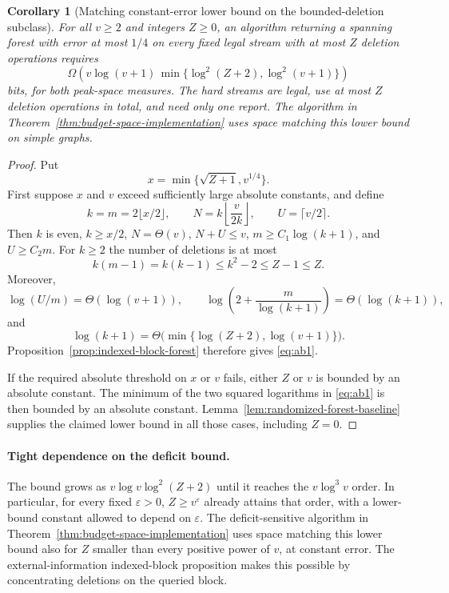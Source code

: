 \documentclass[11pt,letterpaper]{article}
\newtheorem{corollary}[theorem]{Corollary}
\numberwithin{equation}{section}
\begin{document}
\begin{corollary}[Matching constant-error lower bound on the bounded-deletion subclass]
\label{cor:all-budget-block-lower}
For all $v\ge2$ and integers $Z\ge0$, an algorithm returning a spanning forest with error at most $1/4$ on every fixed legal stream with at most $Z$ deletion operations requires
\begin{equation}
\Omega\!\left(
 v\log(v+1)\,
 \min\{\log^2(Z+2),\log^2(v+1)\}\right)
 \label{eq:ab1}
\end{equation}
bits, for both peak-space measures.
The hard streams are legal, use at most $Z$ deletion operations in total, and need only one report.
The algorithm in Theorem~\ref{thm:budget-space-implementation} uses space matching this lower bound on simple graphs.
\end{corollary}
\begin{proof}
Put
\[
 x=\min\{\sqrt{Z+1},v^{1/4}\}.
\]
First suppose $x$ and $v$ exceed sufficiently large absolute constants, and define
\[
 k=m=2\lfloor x/2\rfloor,\qquad
 N=k\left\lfloor\frac v{2k}\right\rfloor,\qquad
 U=\lceil v/2\rceil.
\]
Then $k$ is even, $k\ge x/2$, $N=\Theta(v)$, $N+U\le v$, $m\ge C_1\log(k+1)$, and $U\ge C_2m$.
For $k\ge2$ the number of deletions is at most
\[
 k(m-1)=k(k-1)\le k^2-2\le Z-1\le Z.
\]
Moreover,
\[
 \log(U/m)=\Theta(\log(v+1)),\qquad
 \log\left(2+\frac m{\log(k+1)}\right)=\Theta(\log(k+1)),
\]
and
\[
 \log(k+1)=\Theta\bigl(
   \min\{\log(Z+2),\log(v+1)\}\bigr).
\]
Proposition~\ref{prop:indexed-block-forest} therefore gives \eqref{eq:ab1}.

If the required absolute threshold on $x$ or $v$ fails, either $Z$ or $v$ is bounded by an absolute constant.
The minimum of the two squared logarithms in \eqref{eq:ab1} is then bounded by an absolute constant.
Lemma~\ref{lem:randomized-forest-baseline} supplies the claimed lower bound in all those cases, including $Z=0$.
\end{proof}

\paragraph{Tight dependence on the deficit bound.}
The bound grows as $v\log v\log^2(Z+2)$ until it reaches the $v\log^3v$ order.
In particular, for every fixed $\varepsilon>0$, $Z\ge v^\varepsilon$ already attains that order, with a lower-bound constant allowed to depend on $\varepsilon$.
The deficit-sensitive algorithm in Theorem~\ref{thm:budget-space-implementation} uses space matching this lower bound also for $Z$ smaller than every positive power of $v$, at constant error.
The external-information indexed-block proposition makes this possible by concentrating deletions on the queried block.
\end{document}
